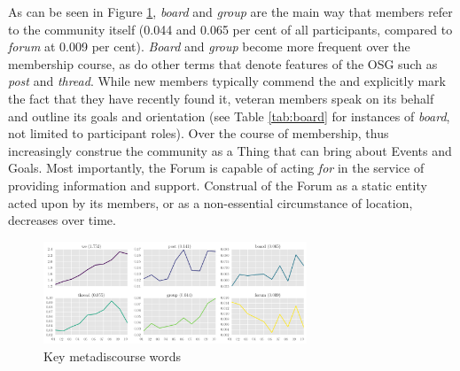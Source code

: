 As can be seen in Figure \ref{fig:metadiscourse}, \emph{board} and \emph{group} are the main way that members refer to the community itself (0.044 and 0.065 per cent of all participants, compared to \emph{forum} at 0.009 per cent). \emph{Board} and \emph{group} become more frequent over the membership course, as do other terms that denote features of the \gls{OSG} such as \emph{post} and \emph{thread}. While new \glspl{member} typically commend the  and explicitly mark the fact that they have recently found it, veteran \glspl{member} speak on its behalf and outline its goals and orientation (see Table \ref{tab:board} for instances of \emph{board}, not limited to participant roles). Over the course of membership,  thus increasingly construe the community as a Thing that can bring about Events and Goals. Most importantly, the \gls{Forum} is capable of acting \emph{for}  in the service of providing information and support. Construal of the \gls{Forum} as a static entity acted upon by its \glspl{member}, or as a non\hyp{}essential circumstance of location, decreases over time.

\begin{figure}[htb]
    \begin{center}
    \includegraphics[width=0.70\textwidth]{../images/subplot-metad.png}
    \end{center}
    \caption{Key metadiscourse words}
    \label{fig:metadiscourse}
    \end{figure}


